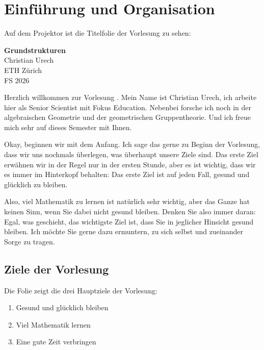 \section{Einführung und Organisation}

\begin{meta-note}
Auf dem Projektor ist die Titelfolie der Vorlesung zu sehen:
\begin{center}
\textbf{Grundstrukturen} \\
Christian Urech \\
ETH Zürich \\
FS 2026
\end{center}
\end{meta-note}


\begin{spoken-clean}[00:00:00 - 00:01:08]
Herzlich willkommen zur Vorlesung . Mein Name ist Christian Urech, ich arbeite hier als Senior Scientist mit Fokus Education. Nebenbei forsche ich noch in der algebraischen Geometrie und der geometrischen Gruppentheorie. Und ich freue mich sehr auf dieses Semester mit Ihnen.

Okay, beginnen wir mit dem Anfang. Ich sage das gerne zu Beginn der Vorlesung, dass wir uns nochmals überlegen, was überhaupt unsere Ziele sind. Das erste Ziel erwähnen wir in der Regel nur in der ersten Stunde, aber es ist wichtig, dass wir es immer im Hinterkopf behalten: Das erste Ziel ist auf jeden Fall, gesund und glücklich zu bleiben.

Also, viel Mathematik zu lernen ist natürlich sehr wichtig, aber das Ganze hat keinen Sinn, wenn Sie dabei nicht gesund bleiben. Denken Sie also immer daran: Egal, was geschieht, das wichtigste Ziel ist, dass Sie in jeglicher Hinsicht gesund bleiben. Ich möchte Sie gerne dazu ermuntern, zu sich selbst und zueinander Sorge zu tragen.
\end{spoken-clean}

\subsection{Ziele der Vorlesung}

\begin{meta-note}
Die Folie zeigt die drei Hauptziele der Vorlesung:
\begin{enumerate}[label=\textbf{(\arabic*)}]
    \item Gesund und glücklich bleiben
    \item Viel Mathematik lernen
    \item Eine gute Zeit verbringen
\end{enumerate}
\end{meta-note}

